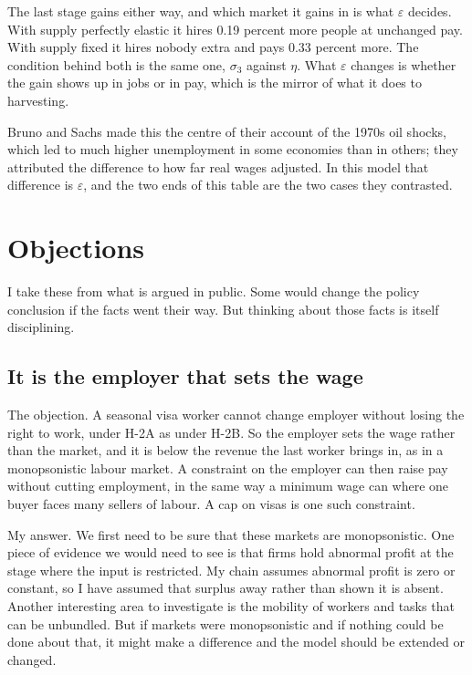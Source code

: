 \documentclass[11pt,a4paper]{article}
\begin{document}
The last stage gains either way, and which market it gains in is what $\varepsilon$ decides. With supply perfectly elastic it hires 0.19 percent more people at unchanged pay. With supply fixed it hires nobody extra and pays 0.33 percent more. The condition behind both is the same one, $\sigma_3$ against $\eta$. What $\varepsilon$ changes is whether the gain shows up in jobs or in pay, which is the mirror of what it does to harvesting.

Bruno and Sachs made this the centre of their account of the 1970s oil shocks, which led to much higher unemployment in some economies than in others; they attributed the difference to how far real wages adjusted. In this model that difference is $\varepsilon$, and the two ends of this table are the two cases they contrasted.

\section{Objections}
\label{sec:obj}

I take these from what is argued in public. Some would change the policy conclusion if the facts went their way. But thinking about those facts is itself disciplining.

\subsection{It is the employer that sets the wage}

The objection. A seasonal visa worker cannot change employer without losing the right to work, under H-2A as under H-2B. So the employer sets the wage rather than the market, and it is below the revenue the last worker brings in, as in a monopsonistic labour market. A constraint on the employer can then raise pay without cutting employment, in the same way a minimum wage can where one buyer faces many sellers of labour. A cap on visas is one such constraint.

My answer. We first need to be sure that these markets are monopsonistic. One piece of evidence we would need to see is that firms hold abnormal profit at the stage where the input is restricted. My chain assumes abnormal profit is zero or constant, so I have assumed that surplus away rather than shown it is absent. Another interesting area to investigate is the mobility of workers and tasks that can be unbundled. But if markets were monopsonistic and if nothing could be done about that, it might make a difference and the model should be extended or changed.
\end{document}
